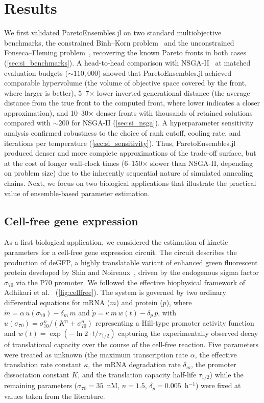 \documentclass[12pt]{article}
\begin{document}
\section{Results}\label{sec:results}
We first validated ParetoEnsembles.jl on two standard multiobjective benchmarks, the constrained Binh--Korn problem~\cite{Binh1997} and the unconstrained Fonseca--Fleming problem~\cite{Fonseca1995}, recovering the known Pareto fronts in both cases (\cref{sec:si_benchmarks}). A head-to-head comparison with NSGA-II~\cite{Deb2002} at matched evaluation budgets (${\sim}110{,}000$) showed that ParetoEnsembles.jl achieved comparable hypervolume (the volume of objective space covered by the front, where larger is better), 5--7$\times$ lower inverted generational distance (the average distance from the true front to the computed front, where lower indicates a closer approximation), and 10--30$\times$ denser fronts with thousands of retained solutions compared with ${\sim}200$ for NSGA-II (\cref{sec:si_nsga}).
A hyperparameter sensitivity analysis confirmed robustness to the choice of rank cutoff, cooling rate, and iterations per temperature (\cref{sec:si_sensitivity}). Thus, ParetoEnsembles.jl produced denser and more complete approximations of the trade-off surface, but at the cost of longer wall-clock times (6--150$\times$ slower than NSGA-II, depending on problem size) due to the inherently sequential nature of simulated annealing chains. Next, we focus on two biological applications that illustrate the practical value of ensemble-based parameter estimation.

\subsection{Cell-free gene expression}\label{sec:cellfree}
As a first biological application, we considered the estimation of kinetic parameters for a cell-free gene expression circuit. The circuit describes the production of deGFP, a highly translatable variant of enhanced green fluorescent protein developed by Shin and Noireaux~\cite{Shin2010}, driven by the endogenous sigma factor $\sigma_{70}$ via the P70 promoter. We followed the effective biophysical framework of Adhikari et al.~\cite{Adhikari2020} (\cref{fig:cellfree}). The system is governed by two ordinary differential equations for mRNA ($m$) and protein ($p$), where $\dot{m} = \alpha\, u(\sigma_{70}) - \delta_m\, m$ and $\dot{p} = \kappa\, m\, w(t) - \delta_p\, p$, with $u(\sigma_{70}) = \sigma_{70}^{n}/(K^n + \sigma_{70}^n)$ representing a Hill-type promoter activity function and $w(t) = \exp(-\ln 2 \cdot t / \tau_{1/2})$ capturing the experimentally observed decay of translational capacity over the course of the cell-free reaction. Five parameters were treated as unknown (the maximum transcription rate $\alpha$, the effective translation rate constant $\kappa$, the mRNA degradation rate $\delta_m$, the promoter dissociation constant $K$, and the translation capacity half-life $\tau_{1/2}$) while the remaining parameters ($\sigma_{70} = 35$~nM, $n = 1.5$, $\delta_p = 0.005$~h$^{-1}$) were fixed at values taken from the literature.
\end{document}
